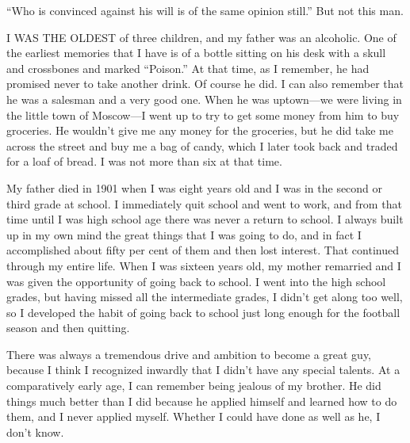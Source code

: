 
\bbChapterPreamble


\begin{biblechapter}
    “Who is convinced against his will is of the same opinion still.”
\verse But not this man.
\end{biblechapter}


\begin{biblechapter}
    I WAS THE OLDEST of three children, 
    and my father was an alcoholic.
\verse One of the earliest memories that I have 
    is of a bottle sitting on his desk 
    with a skull and crossbones and marked “Poison.”
\verse At that time, as I remember, 
    he had promised never to take another drink.
\verse Of course he did.
\verse I can also remember that he was a salesman 
    and a very good one.
\verse When he was uptown—we were living in the little town of 
    Moscow—I went up to try to get some money from him 
    to buy groceries.
\verse He wouldn’t give me any money for the groceries, 
    but he did take me across the street 
    and buy me a bag of candy, 
    which I later took back 
    and traded for a loaf of bread.
\verse I was not more than six at that time.

\verse My father died in 1901 when I was eight years old 
    and I was in the second or third grade at school.
\verse I immediately quit school and went to work, 
    and from that time until I was high school age 
    there was never a return to school.
\verse I always built up in my own mind 
    the great things that I was going to do, 
    and in fact I accomplished about fifty per cent of them 
    and then lost interest.
\verse That continued through my entire life.
\verse When I was sixteen years old, 
    my mother remarried 
    and I was given the opportunity of going back to school.
\verse I went into the high school grades, 
    but having missed all the intermediate grades, 
    I didn’t get along too well, 
    so I developed the habit of going back to school 
    just long enough for the football season and then quitting.

\verse There was always a tremendous drive and ambition 
    to become a great guy, 
    because I think I recognized inwardly 
    that I didn’t have any special talents.
\verse At a comparatively early age, 
    I can remember being jealous of my brother.
\verse He did things much better than I did 
    because he applied himself 
    and learned how to do them, 
    and I never applied myself.
\verse Whether I could have done as well as he, I don’t know.
\end{biblechapter}


